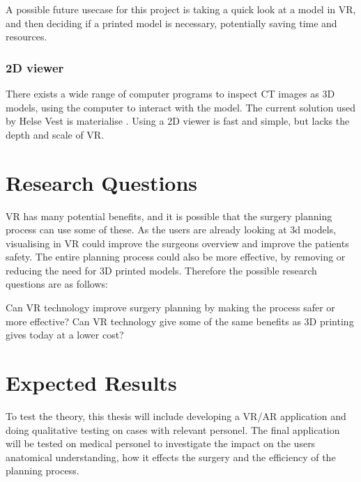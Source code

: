 \documentclass[11pt]{scrartcl}
\begin{document}
A possible future usecase for this project is taking a quick look at a model in VR, and then deciding if a printed model is necessary, potentially saving time and resources.

\subsubsection {2D viewer}

There exists a wide range of computer programs to inspect CT images as 3D models, using the computer to interact with the model.
The current solution used by Helse Vest is materialise \cite{materialise}. Using a 2D viewer is fast and simple, but lacks the depth and scale of VR.


\section{Research Questions}
VR has many potential benefits, and it is possible that the surgery planning process can use some of these. As the users are already looking at 3d models, visualising in VR could improve the surgeons overview and improve the patients safety. The entire planning process could also be more effective, by removing or reducing the need for 3D printed models. Therefore the possible research questions are as follows:

Can VR technology improve surgery planning by making the process safer or more effective?
Can VR technology give some of the same benefits as 3D printing gives today at a lower cost?


\section{Expected Results}
To test the theory, this thesis will include developing a VR/AR application and doing qualitative testing on cases with relevant personel.
The final application will be tested on medical personel to investigate the impact on the users anatomical understanding, how it effects the surgery and the efficiency of the planning process. 
\end{document}
